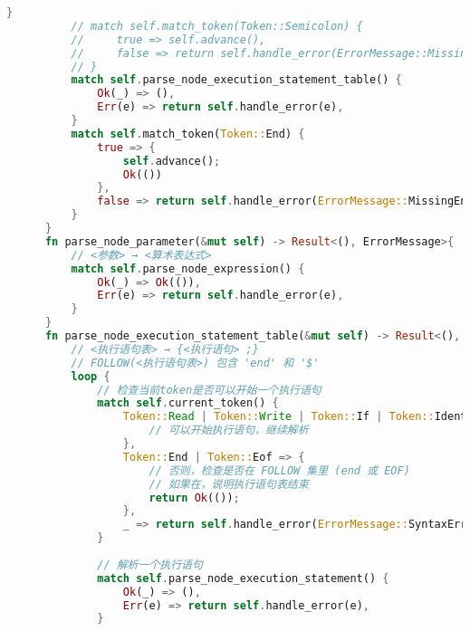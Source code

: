 \begin{lstlisting}[caption={语法分析器parse.rs}, label={4:code-example}, captionpos=t, language=rust]
          }
          // match self.match_token(Token::Semicolon) {
          //     true => self.advance(),
          //     false => return self.handle_error(ErrorMessage::MissingSemicolon)
          // }
          match self.parse_node_execution_statement_table() {
              Ok(_) => (),
              Err(e) => return self.handle_error(e),
          }
          match self.match_token(Token::End) {
              true => {
                  self.advance();
                  Ok(())
              },
              false => return self.handle_error(ErrorMessage::MissingEnd)
          }
      }
      fn parse_node_parameter(&mut self) -> Result<(), ErrorMessage>{
          // <参数> → <算术表达式>
          match self.parse_node_expression() {
              Ok(_) => Ok(()),
              Err(e) => return self.handle_error(e),
          }
      }
      fn parse_node_execution_statement_table(&mut self) -> Result<(), ErrorMessage>{
          // <执行语句表> → {<执行语句> ;}
          // FOLLOW(<执行语句表>) 包含 'end' 和 '$'
          loop {
              // 检查当前token是否可以开始一个执行语句
              match self.current_token() {
                  Token::Read | Token::Write | Token::If | Token::Identifier(_) => {
                      // 可以开始执行语句，继续解析
                  },
                  Token::End | Token::Eof => {
                      // 否则，检查是否在 FOLLOW 集里 (end 或 EOF)
                      // 如果在，说明执行语句表结束
                      return Ok(());
                  },
                  _ => return self.handle_error(ErrorMessage::SyntaxError),
              }
              
              // 解析一个执行语句
              match self.parse_node_execution_statement() {
                  Ok(_) => (),
                  Err(e) => return self.handle_error(e),
              }
              

\end{lstlisting}
